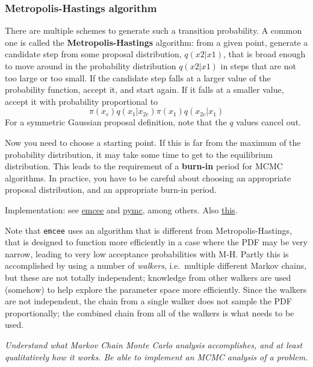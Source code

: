 \documentclass{article}
\newcommand{\test}[1]{%
    \begin{center}
        \colorbox{hl}{\parbox{0.9\textwidth}{\emph{\centering #1}}}
    \end{center}}
\begin{document}
\subsubsection{Metropolis-Hastings algorithm}
There are multiple schemes to generate such a transition probability. A common
one is called the \textbf{Metropolis-Hastings} algorithm: from a given point,
generate a candidate step from some proposal distribution, $q(x2|x1)$, that is
broad enough to move around in the probability distribution $q(x2|x1)$ in steps
that are not too large or too small. If the candidate step falls at a larger
value of the probability function, accept it, and start again. If it falls at a
smaller value, accept it with probability proportional to
\[
    \pi \left( x_{c} \right) q \left( x_{1} | x_{2c} \right)
    \pi \left( x_{1} \right) q \left( x_{2c} | x_{1} \right)
    \]
For a symmetric Gaussian proposal definition, note that the $q$ values
cancel out.

Now you need to choose a starting point. If this is far from the
maximum of the probability distribution, it may take some time to get to the
equilibrium distribution. This leads to the requirement of a \textbf{burn-in}
period for MCMC algorithms. In practice, you have to be careful about choosing
an appropriate proposal distribution, and an appropriate burn-in period.

Implementation: see \href{http://dan.iel.fm/emcee/current/}
{emcee} and \href{https://pymc-devs.github.io/pymc/}
{pymc}, among others. Also
\href{http://jakevdp.github.io/blog/2014/06/14/frequentism-and-bayesianism-4-bayesian-in-python/}
{this}.

Note that \texttt{emcee} uses an algorithm that is different from
Metropolis-Hastings, that is designed to function more efficiently in a case
where the PDF may be very narrow, leading to very low acceptance probabilities
with M-H. Partly this is accomplished by using a number of \textit{walkers},
i.e.\ multiple different Markov chains, but these are not totally independent;
knowledge from other walkers are used (somehow) to help explore the parameter
space more efficiently. Since the walkers are not independent, the chain from a
single walker does not sample the PDF proportionally; the combined chain from
all of the walkers is what needs to be used.

\test{Understand what Markov Chain Monte Carlo analysis accomplishes, and at
least qualitatively how it works. Be able to implement an MCMC analysis of
a problem.}
\end{document}
